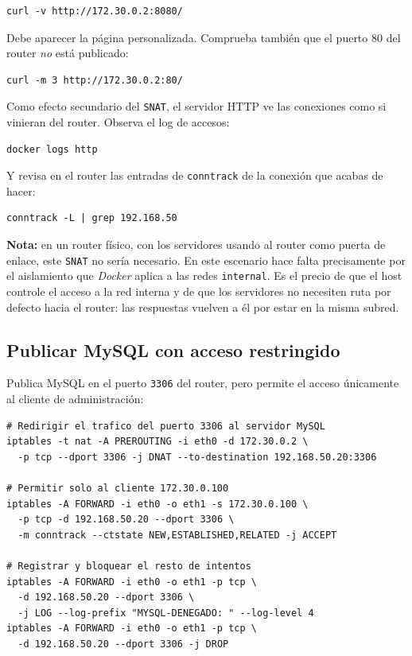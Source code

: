 \documentclass[a4paper]{article}
\begin{document}
\begin{verbatim}
curl -v http://172.30.0.2:8080/
\end{verbatim}

Debe aparecer la página personalizada. Comprueba también que el puerto 80 del router \emph{no} está publicado:

\begin{verbatim}
curl -m 3 http://172.30.0.2:80/
\end{verbatim}

Como efecto secundario del \texttt{SNAT}, el servidor HTTP ve las conexiones como si vinieran del router. Observa el log de accesos:

\begin{verbatim}
docker logs http
\end{verbatim}

Y revisa en el router las entradas de \texttt{conntrack} de la conexión que acabas de hacer:

\begin{verbatim}
conntrack -L | grep 192.168.50
\end{verbatim}

\textbf{Nota:} en un router físico, con los servidores usando al router como puerta de enlace, este \texttt{SNAT} no sería necesario. En este escenario hace falta precisamente por el aislamiento que \emph{Docker} aplica a las redes \texttt{internal}. Es el precio de que el host controle el acceso a la red interna y de que los servidores no necesiten ruta por defecto hacia el router: las respuestas vuelven a él por estar en la misma subred.
\subsection{Publicar MySQL con acceso restringido}
\label{sec:orge5cb692}

Publica MySQL en el puerto \texttt{3306} del router, pero permite el acceso únicamente al cliente de administración:

\begin{verbatim}
# Redirigir el trafico del puerto 3306 al servidor MySQL
iptables -t nat -A PREROUTING -i eth0 -d 172.30.0.2 \
  -p tcp --dport 3306 -j DNAT --to-destination 192.168.50.20:3306

# Permitir solo al cliente 172.30.0.100
iptables -A FORWARD -i eth0 -o eth1 -s 172.30.0.100 \
  -p tcp -d 192.168.50.20 --dport 3306 \
  -m conntrack --ctstate NEW,ESTABLISHED,RELATED -j ACCEPT

# Registrar y bloquear el resto de intentos
iptables -A FORWARD -i eth0 -o eth1 -p tcp \
  -d 192.168.50.20 --dport 3306 \
  -j LOG --log-prefix "MYSQL-DENEGADO: " --log-level 4
iptables -A FORWARD -i eth0 -o eth1 -p tcp \
  -d 192.168.50.20 --dport 3306 -j DROP
\end{verbatim}
\end{document}
